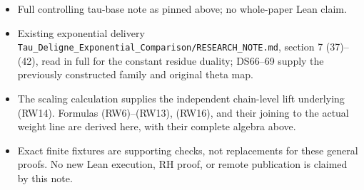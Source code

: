 \begin{itemize}
\tightlist
\item
  Full controlling tau-base note as pinned above; no whole-paper Lean claim.
\item
  Existing exponential delivery \nolinkurl{Tau_Deligne_Exponential_Comparison/RESEARCH_NOTE.md}, section 7 (37)--(42), read in full for the constant residue duality; DS66--69 supply the previously constructed family and original theta map.
\item
  The scaling calculation supplies the independent chain-level lift underlying (RW14). Formulas (RW6)--(RW13), (RW16), and their joining to the actual weight line are derived here, with their complete algebra above.
\item
  Exact finite fixtures are supporting checks, not replacements for these general proofs. No new Lean execution, RH proof, or remote publication is claimed by this note.
\end{itemize}

